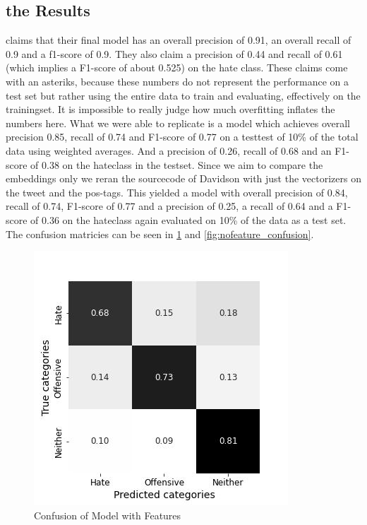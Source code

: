 \documentclass[11pt,a4paper]{article}
\begin{document}
\subsection{the Results}
\cite{auto_hatespeech} claims that their final model has an overall precision of 0.91, an overall recall of 0.9 and a f1-score of 0.9.
They also claim a precision of 0.44 and recall of 0.61 (which implies a F1-score of about 0.525) on the hate class.
These claims come with an asteriks, because these numbers do not represent the performance on a test set but rather using the entire
data to train and evaluating, effectively on the trainingset. 
It is impossible to really judge how much overfitting inflates the numbers here.
What we were able to replicate is a model which achieves overall precision 0.85, recall of 0.74 and F1-score of 0.77 on a testtest of 10\% of the total data
using weighted averages.
And a precision of 0.26, recall of 0.68 and an F1-score of 0.38 on the hateclass in the testset.
Since we aim to compare the embeddings only we reran the sourcecode of Davidson with just the vectorizers on the tweet and the pos-tags.
This yielded a model with overall precision of 0.84, recall of 0.74, F1-score of 0.77
and a precision of 0.25, a recall of 0.64 and a F1-score of 0.36 on the hateclass again evaluated on 10\% of the data as a test set.
The confusion matricies can be seen in \ref{fig:feature_confusion} and \ref{fig:nofeature_confusion}.
\begin{figure}%
  \includegraphics[width=\linewidth]{feat_confusion.jpg}
  \caption{Confusion of Model with Features}
  \label{fig:feature_confusion}
\end{figure}
\end{document}
